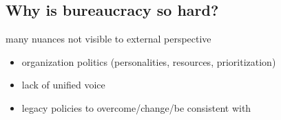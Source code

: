 \subsection{Why is bureaucracy so hard?}
many nuances not visible to external perspective
\begin{itemize}
    \item organization politics (personalities, resources, prioritization)
\item lack of unified voice
\item legacy policies to overcome/change/be consistent with
\end{itemize}
